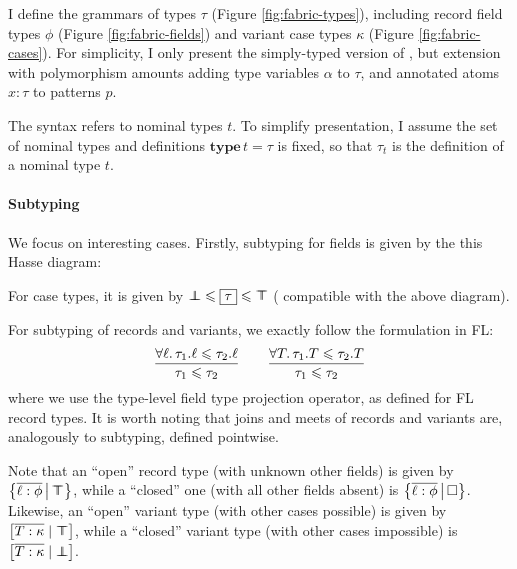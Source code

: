 I define the grammars of types $\tau$ (Figure \ref{fig:fabric-types}), including record field types $\phi$ (Figure \ref{fig:fabric-fields}) and variant case types $\kappa$ (Figure \ref{fig:fabric-cases}). For simplicity, I only present the simply-typed version of \fabric{}, but extension with polymorphism amounts adding type variables $\alpha$ to $\tau$, and annotated atoms $x : \tau$ to patterns $p$.

The syntax refers to nominal types $t$. To simplify presentation, I assume the set of nominal types and definitions $\mathbf{type}\,t=\tau$ is fixed, so that $\tau_t$ is the definition of a nominal type $t$.

\paragraph{Subtyping} 
We focus on interesting cases. Firstly, subtyping for fields is given by the this Hasse diagram:
\begin{center}
\end{center}
For case types, it is given by $\flfbot \sub \flpresent \tau \sub \flftop$ (\ie{} compatible with the above diagram).

For subtyping of records and variants, we exactly follow the formulation in FL:
$$ 
\dfrac{\forall \ell \ldotp {\tau_1}{.}{\ell} \leqslant {\tau_2}{.}{\ell}}{\tau_1 \leqslant \tau_2}
\qquad 
\dfrac{\forall T \ldotp {\tau_1}{.}{T} \leqslant {\tau_2}{.}{T}}{\tau_1 \leqslant \tau_2} 
$$
where we use the type-level field type projection operator, as defined for FL record types. It is worth noting that joins and meets of records and variants are, analogously to subtyping, defined pointwise.

Note that an \enquote{open} record type (with unknown other fields) is given by $\flext{\overline{\ell : \phi}}{\flftop}$, while a \enquote{closed} one (with all other fields absent) is $\flext{\overline{\ell : \phi}}{\flabsent}$. 
Likewise, an \enquote{open} variant type (with other cases possible) is given by $\fbvar{\overline{T : \kappa}}{\flftop}$, while a \enquote{closed} variant type (with other cases impossible) is $\fbvar{\overline{T : \kappa}}{\flfbot}$.

